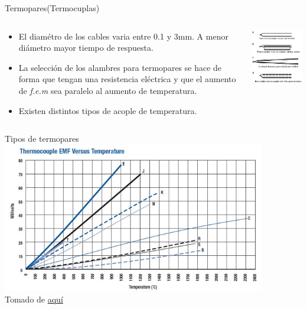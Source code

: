 \documentclass[aspectratio=169]{beamer}
\begin{document}
\begin{frame}{Termopares(Termocuplas)}
    \begin{columns}[c, onlytextwidth]
        \begin{column}{0.45\textwidth}
            \begin{itemize}
                \item El diamétro de los cables varia entre 0.1 y 3mm. A menor diámetro mayor tiempo de respuesta. 
                \item La selección de los alambres para termopares se hace de forma que tengan una resistencia eléctrica y que el aumento de \textit{f.e.m} sea paralelo al aumento de temperatura.
                \item Existen distintos tipos de acople de temperatura.
                
            \end{itemize}
        \end{column}
        \begin{column}{0.5\textwidth}
            \includegraphics[width=6cm]{fig/ensamble_termopar.PNG}
            \\ \cite{Fraden_2016}
        \end{column}
    \end{columns}
\end{frame}

\begin{frame}{Tipos de termopares}
\centering
    \includegraphics[width=11.5cm]{fig/Thermocouple_EMF_Temperature.png}
     \\ \tiny{Tomado de \href{https://www.akcp.com/blog/what-is-a-k-type-thermocouple/}{aquí}}
\end{frame}
\end{document}

